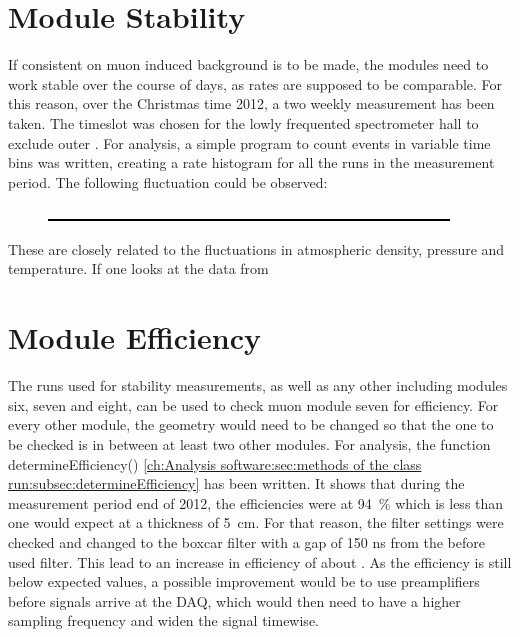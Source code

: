   \section{Module Stability}
  \label{ch:Analysis:sec:Module Stability}
  If consistent  on muon induced background is to be made, the modules need to work stable over the course of days, as rates are supposed to be comparable. For this reason, over the Christmas time 2012, a two weekly measurement has been taken. The timeslot was chosen for the lowly frequented spectrometer hall to exclude outer . For analysis, a simple program to count events in variable time bins was written, creating a rate histogram for all the runs in the measurement period. The following fluctuation could be observed:
  \begin{figure}
	\centering
  	\includegraphics[width = 0.9 \textwidth]{graphics/dummy.eps}
  \end{figure}
  These are closely related to the fluctuations in atmospheric density, pressure and temperature. If one looks at the data from 

  \section{Module Efficiency}
  \label{ch:Analysis:sec:Module Efficiency}
  The runs used for stability measurements, as well as any other including modules six, seven and eight, can be used to check muon module seven for efficiency. For every other module, the geometry would need to be changed so that the one to be checked is in between at least two other modules.
  For analysis, the function determineEfficiency() \ref{ch:Analysis software:sec:methods of the class run:subsec:determineEfficiency}
  has been written.
  It shows that during the measurement period end of 2012, the efficiencies were at  \SI{94 }{\percent} which is less than one would expect at a thickness of \SI{5}{\centi\meter}.
  For that reason, the filter settings were checked and changed to the boxcar filter with a gap of 150 ns from the before used  filter. This lead to an increase in efficiency of about .
  As the efficiency is still below expected values, a possible improvement would be to use preamplifiers before signals arrive at the DAQ, which would then need to have a higher sampling frequency and widen the signal timewise.
  
